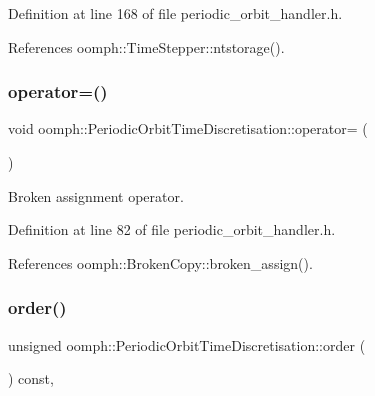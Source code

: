 Definition at line 168 of file periodic\+\_\+orbit\+\_\+handler.\+h.



References oomph\+::\+Time\+Stepper\+::ntstorage().

\mbox{\label{classoomph_1_1PeriodicOrbitTimeDiscretisation_a2d0767948e0120cf8e913bd52c459940}} 
\subsubsection{\texorpdfstring{operator=()}{operator=()}}
{\footnotesize\ttfamily void oomph\+::\+Periodic\+Orbit\+Time\+Discretisation\+::operator= (\begin{DoxyParamCaption}\item[{const \hyperlink{classoomph_1_1PeriodicOrbitTimeDiscretisation}{Periodic\+Orbit\+Time\+Discretisation} \&}]{ }\end{DoxyParamCaption})\hspace{0.3cm}{\ttfamily [inline]}}



Broken assignment operator. 



Definition at line 82 of file periodic\+\_\+orbit\+\_\+handler.\+h.



References oomph\+::\+Broken\+Copy\+::broken\+\_\+assign().

\mbox{\label{classoomph_1_1PeriodicOrbitTimeDiscretisation_a395bce926ad4a0dfb474aaf05f607b99}} 
\subsubsection{\texorpdfstring{order()}{order()}}
{\footnotesize\ttfamily unsigned oomph\+::\+Periodic\+Orbit\+Time\+Discretisation\+::order (\begin{DoxyParamCaption}{ }\end{DoxyParamCaption}) const\hspace{0.3cm}{\ttfamily [inline]}, {\ttfamily [virtual]}}



